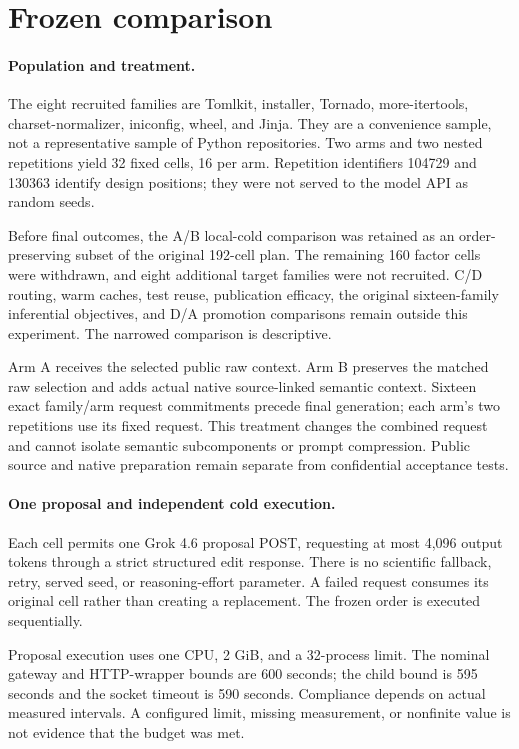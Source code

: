 \section{Frozen comparison}
\label{sec:design}

\paragraph{Population and treatment.}
The eight recruited families are Tomlkit, installer, Tornado, more-itertools,
charset-normalizer, iniconfig, wheel, and Jinja. They are a convenience sample,
not a representative sample of Python repositories. Two arms and two nested
repetitions yield 32 fixed cells, 16 per arm. Repetition identifiers 104729 and
130363 identify design positions; they were not served to the model API as
random seeds.

Before final outcomes, the A/B local-cold comparison was retained as an
order-preserving subset of the original 192-cell plan. The remaining 160 factor
cells were withdrawn, and eight additional target families were not recruited.
C/D routing, warm caches, test reuse, publication efficacy, the original
sixteen-family inferential objectives, and D/A promotion comparisons remain
outside this experiment. The narrowed comparison is descriptive.

Arm A receives the selected public raw context. Arm B preserves the matched
raw selection and adds actual native source-linked semantic context.
Sixteen exact family/arm request commitments precede final generation; each
arm's two repetitions use its fixed request. This treatment changes the
combined request and cannot isolate semantic subcomponents or prompt
compression. Public source and native preparation remain separate from
confidential acceptance tests.

\paragraph{One proposal and independent cold execution.}
Each cell permits one Grok 4.6 proposal POST, requesting at most 4,096 output
tokens through a strict structured edit response. There is no scientific
fallback, retry, served seed, or reasoning-effort parameter. A failed request
consumes its original cell rather than creating a replacement. The frozen
order is executed sequentially.

Proposal execution uses one CPU, 2 GiB, and a 32-process limit. The nominal
gateway and HTTP-wrapper bounds are 600 seconds; the child bound is 595 seconds
and the socket timeout is 590 seconds. Compliance depends on actual measured
intervals. A configured limit, missing measurement, or nonfinite value is not
evidence that the budget was met.

